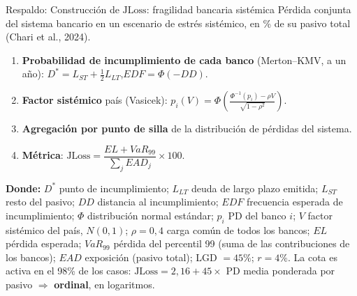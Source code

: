 \documentclass[aspectratio=169]{beamer}
\newcommand{\JLoss}{\mathrm{JLoss}}
\begin{document}
\begin{frame}{Respaldo: Construcción de $\JLoss$: fragilidad bancaria sistémica}
\small
Pérdida conjunta del sistema bancario en un escenario de estrés sistémico, en \% de su pasivo total (Chari et al., 2024).
\begin{enumerate}
\item \textbf{Probabilidad de incumplimiento de cada banco} (Merton--KMV, a un año): $D^*=L_{ST}+\tfrac12L_{LT}$,\quad $EDF=\Phi(-DD)$.
\item \textbf{Factor sistémico} país (Vasicek): $p_i(V)=\Phi\!\left(\frac{\Phi^{-1}(p_i)-\rho V}{\sqrt{1-\rho^2}}\right)$.
\item \textbf{Agregación por punto de silla} de la distribución de pérdidas del sistema.
\item \textbf{Métrica}: $\JLoss=\dfrac{EL+VaR_{99}}{\sum_j EAD_j}\times100$.
\end{enumerate}
\vspace{2pt}
{\scriptsize \textbf{Donde:} $D^*$ punto de incumplimiento; $L_{LT}$ deuda de largo plazo emitida; $L_{ST}$ resto del pasivo; $DD$ distancia al incumplimiento; $EDF$ frecuencia esperada de incumplimiento; $\Phi$ distribución normal estándar; $p_i$ PD del banco $i$; $V$ factor sistémico del país, $N(0,1)$; $\rho=0{,}4$ carga común de todos los bancos; $EL$ pérdida esperada; $VaR_{99}$ pérdida del percentil 99 (suma de las contribuciones de los bancos); $EAD$ exposición (pasivo total); LGD $=45\%$; $r=4\%$. La cota es activa en el 98\% de los casos: $\JLoss=2{,}16+45\times$ PD media ponderada por pasivo $\Rightarrow$ \textbf{ordinal}, en logaritmos.\par}
\end{frame}
\end{document}
